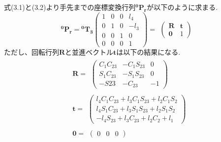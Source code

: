	式(3.1)と(3.2)より手先までの座標変換行列$\boldsymbol{ ^{0}P_{r} }$が以下のように求まる.
	\begin{equation*}
		\boldsymbol{ ^{0}P_{r} } =
		\boldsymbol{^{0}T_{3}}
		\left(
		\begin{array}{cccc}
			1 & 0 & 0 & l_4\\
			0 & 1 & 0 & -l_3\\
			0 & 0 & 1 & 0\\
			0 & 0 & 0 & 1
		\end{array}
		\right)=
		\begin{array}{cc}
			\left(
				\begin{array}{cc}
					\boldsymbol{R} & \boldsymbol{t} \\
					\boldsymbol{0} & 1
				\end{array}
			\right)
		\end{array}
	\end{equation*}
	ただし、回転行列$\boldsymbol{R}$と並進ベクトル$\boldsymbol{t}$は以下の結果になる.
	\begin{equation*}
	\begin{split}
		&\boldsymbol{R} =
		\begin{array}{cc}
			\left(
				\begin{array}{ccc}
					C_1C_{23} & -C_1S_{23} & 0 \\
					S_1C_{23} & -S_1S_{23} & 0 \\
					-S{23} & -C_{23} & -1
				\end{array}
			\right)
		\end{array} \\
		&\boldsymbol{t} =
		\begin{array}{cc}
			\left(
				\begin{array}{c}
					l_4C_1C_{23}+l_3C_1S_{23}+l_2C_1S_2 \\
					l_4S_1C_{23}+l_3S_1S_{23}+l_2S_1S_2 \\
				-l_4S_{23}+l_3C_{23}+l_2C_2+l_1
				\end{array}
			\right)
		\end{array}\\
		&\boldsymbol{0} =
		\begin{array}{cc}
			\left(
				\begin{array}{ccc}
					0 & 0 & 0
				\end{array}
			\right)
		\end{array}
	\end{split}
	\end{equation*}

